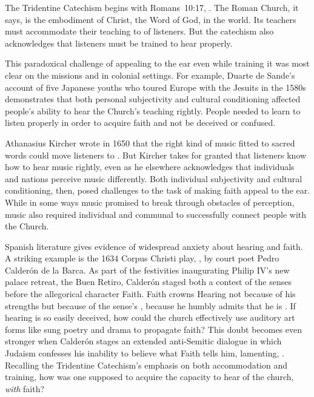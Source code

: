\documentclass{vcbook-proposal}
\begin{document}
The Tridentine Catechism begins with Romans~10:17, .%
    \Autocite{Catholic:Catechismus1614}
The Roman Church, it says, is the embodiment of Christ, the Word of God, in the 
world.
Its teachers must accommodate their teaching to  of listeners.
But the catechism also acknowledges that listeners must be trained to hear 
properly.

This paradoxical challenge of appealing to the ear even while training it was 
most clear on the missions and in colonial settings.
For example, Duarte de Sande's account of five Japanese youths who toured Europe
with the Jesuits in the 1580s demonstrates that both personal subjectivity and
cultural conditioning affected people's ability to hear the Church's teaching
rightly.%
  \Autocite{Massarella:JapaneseTravellers}
People needed to learn to listen properly in order to acquire faith and not be 
deceived or confused.

Athanasius Kircher wrote in 1650 that the right kind of music fitted to sacred
words could move listeners to .%
  \Autocite{Kircher:Musurgia}
But Kircher takes for granted that listeners know how to hear music rightly, 
even as he elsewhere acknowledges that individuals and nations perceive music 
differently.
Both individual subjectivity and cultural conditioning, then, posed challenges
to the task of making faith appeal to the ear.
While in some ways music promised to break through obstacles of perception, 
music also required individual and communal  to 
successfully connect people with the Church.

Spanish literature gives evidence of widespread anxiety about hearing and faith.
A striking example is the 1634 Corpus Christi play, , by court poet Pedro Calderón de la Barca.%
    \Autocite{Calderon:Retiro}
As part of the festivities inaugurating Philip IV's new palace retreat, the 
Buen Retiro, Calderón staged both a contest of the senses before the allegorical
character Faith.
Faith crowns Hearing not because of his strengths but because of the sense's 
, because he humbly admits that he is .
If hearing is so easily deceived, how could the church effectively use auditory
art forms like sung poetry and drama to propagate faith?  
This doubt becomes even stronger when Calderón stages an extended anti-Semitic 
dialogue in which Judaism confesses his inability to believe what Faith tells
him, lamenting, .
Recalling the Tridentine Catechism's emphasis on both accommodation and 
training, how was one supposed to acquire the capacity to hear  of the church, \emph{with} faith?
\end{document}
